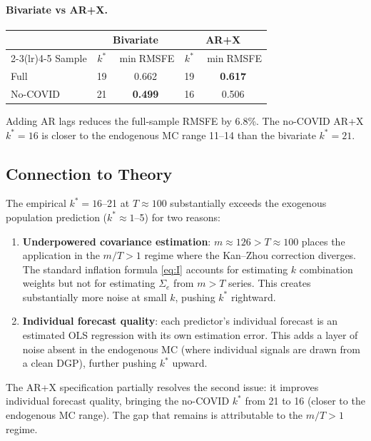 \documentclass[12pt,a4paper]{article}
\theoremstyle{definition}
\begin{document}
\paragraph{Bivariate vs AR+X.}
\begin{center}
\begin{tabular}{lcccc}
\toprule
 & \multicolumn{2}{c}{Bivariate} & \multicolumn{2}{c}{AR+X} \\
\cmidrule(lr){2-3}\cmidrule(lr){4-5}
Sample & $k^*$ & $\min$RMSFE & $k^*$ & $\min$RMSFE \\
\midrule
Full     & 19 & 0.662 & 19 & \textbf{0.617} \\
No-COVID & 21 & \textbf{0.499} & 16 & 0.506 \\
\bottomrule
\end{tabular}
\end{center}
Adding AR lags reduces the full-sample RMSFE by 6.8\%. The no-COVID AR+X
$k^*=16$ is closer to the endogenous MC range 11--14 than the bivariate
$k^*=21$.

\subsection{Connection to Theory}

The empirical $k^*=16$--21 at $T\approx100$ substantially exceeds the
exogenous population prediction ($k^*\approx1$--5) for two reasons:
\begin{enumerate}
\item \textbf{Underpowered covariance estimation}: $m\approx126>T\approx100$
  places the application in the $m/T>1$ regime where the Kan--Zhou correction
  diverges. The standard inflation formula \eqref{eq:I} accounts for estimating
  $k$ combination weights but not for estimating $\Sigma_e$ from $m>T$ series.
  This creates substantially more noise at small $k$, pushing $k^*$ rightward.
\item \textbf{Individual forecast quality}: each predictor's individual forecast
  is an estimated OLS regression with its own estimation error. This adds a
  layer of noise absent in the endogenous MC (where individual signals are
  drawn from a clean DGP), further pushing $k^*$ upward.
\end{enumerate}
The AR+X specification partially resolves the second issue: it improves
individual forecast quality, bringing the no-COVID $k^*$ from 21 to 16
(closer to the endogenous MC range). The gap that remains is
attributable to the $m/T>1$ regime.

\end{document}
